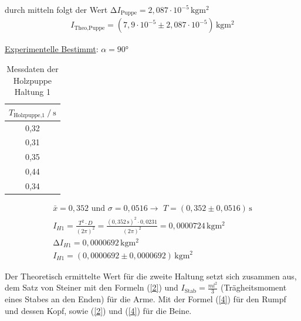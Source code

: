 durch mitteln folgt der Wert  $ \increment I_{\text{Puppe}} = 2,087 \cdot 10^{-5}\,\unit{\kilo\gram\meter^2} $\\
\begin{align*}
    I_{\text{Theo,Puppe}} = (7,9 \cdot 10^{-5} \pm 2,087 \cdot 10^{-5})\, \unit{\kilogram\meter^2} 
\end{align*}

\begin{flushleft}     
    \underline{Experimentelle Bestimmt}: \to $ \alpha = 90 \unit{\degree} $
\end{flushleft}

\begin{table}
    \centering
    \caption{Messdaten der Holzpuppe Haltung 1}
    \label{Tabelle6}
    \begin{tabular} {c}
        \toprule
        {$ T_{\text{Holzpuppe,1}} \mathbin{/} \unit{\second} $} \\
        \midrule
        0,32 \\
        0,31 \\
        0,35 \\
        0,44 \\
        0,34 \\
        \bottomrule
    \end{tabular} 
\end{table}

\begin{align*}
     \bar{x} = 0,352 \, \, \text{und}\, \,  \sigma = 0,0516  \to \,\,T = (0,352 \pm 0,0516)\, \unit{\second}  \\
     I_{H1} = \frac{T^2 \cdot D}{(2\pi)^2} = \frac{(0,352\, \unit{\second})^2 \cdot 0,0231}{(2\pi)^2} = 0,0000724\,\unit{\kilo\gram\meter^2} \\
     \increment I_{H1} = 0,0000692\,\unit{\kilo\gram\meter^2}   \\
     I_{H1} = ( 0,0000692 \pm 0,0000692 )\, \unit{\kilogram\meter^2}  
\end{align*}

\newpage

\begin{flushleft}
    Der Theoretisch ermittelte Wert für die zweite Haltung setzt sich zusammen aus, dem Satz von Steiner
    mit den Formeln (\ref{2}) und $ I_{\text{Stab}} = \frac{ml^2}{3} $ (Trägheitsmoment eines Stabes an den Enden)
    für die Arme. Mit der Formel (\ref{4}) für den Rumpf und dessen Kopf, sowie (\ref{2}) und (\ref{4}) für die Beine.
\end{flushleft}

